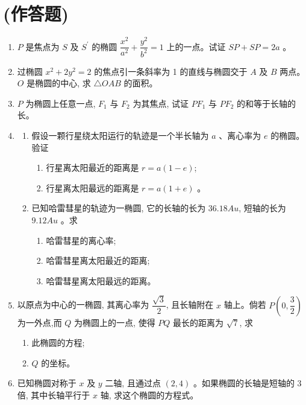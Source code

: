 \documentclass[10pt]{article}
\begin{document}
\section*{(作答题)}
\begin{enumerate}
  \item $P$ 是焦点为 $S$ 及 $S^{\prime}$ 的椭圆 $\dfrac{x^{2}}{a^{2}}+\dfrac{y^{2}}{b^{2}}=1$ 上的一点。试证 $SP+SP=2 a$ 。
  \item 过椭圆 $x^{2}+2 y^{2}=2$ 的焦点引一条斜率为 1 的直线与椭圆交于 $A$ 及 $B$ 两点。 $O$ 是椭圆的中心, 求 $\triangle OAB$ 的面积。
  \item $P$ 为椭圆上任意一点, $F_{1}$ 与 $F_{2}$ 为其焦点, 试证 $PF_{1}$ 与 $PF_{2}$ 的和等于长轴的长。

  \item \begin{enumerate}
    \item 假设一颗行星绕太阳运行的轨迹是一个半长轴为 $a$ 、离心率为 $e$ 的椭圆。验证

    \begin{enumerate}
      \item 行星离太阳最近的距离是 $r=a(1-e)$;
      \item 行星离太阳最远的距离是 $r=a(1+e)$ 。
    \end{enumerate}
    
    \item 已知哈雷彗星的轨迹为一椭圆, 它的长轴的长为 $36.18 Au$, 短轴的长为 $9.12 Au$ 。求
    
    \begin{enumerate}
      \item 哈雷彗星的离心率;
      \item 哈雷彗星离太阳最近的距离;
      \item 哈雷彗星离太阳最远的距离。
    \end{enumerate}
  \end{enumerate}
  \item 以原点为中心的一椭圆, 其离心率为 $\dfrac{\sqrt{3}}{2}$, 且长轴附在 $x$ 轴上。倘若 $P\left(0, \dfrac{3}{2}\right)$ 为一外点,而 $Q$ 为椭圆上的一点, 使得 $PQ$ 最长的距离为 $\sqrt{7}$, 求
  \begin{enumerate}
    \item 此椭圆的方程;
    \item $Q$ 的坐标。
  \end{enumerate}
  \item 已知椭圆对称于 $x$ 及 $y$ 二轴, 且通过点 $(2,4)$ 。如果椭圆的长轴是短轴的 3 倍, 其中长轴平行于 $x$ 轴, 求这个椭圆的方程式。


\end{enumerate}
\end{document}
